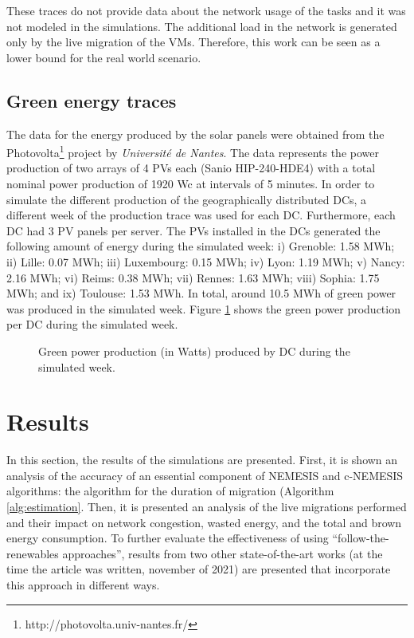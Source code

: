 These traces do not provide data about the network usage of the tasks and it was not modeled in the simulations. The additional load in the network is generated only by the live migration of the VMs. Therefore, this work can be seen as a lower bound for the real world scenario. 

\subsection{Green energy traces}

The data for the energy produced by the solar panels were obtained from the Photovolta\footnote{http://photovolta.univ-nantes.fr/} project by \textit{Université de Nantes}. The data represents the power production of two arrays of 4 PVs each (Sanio HIP-240-HDE4) with a total nominal power production of 1920 Wc at intervals of 5 minutes. In order to simulate the different production of the geographically distributed DCs,  a different week of the production trace was used for each DC. Furthermore, each DC had 3 PV panels per server. The PVs installed in the DCs generated the following amount of energy during the simulated week: i) Grenoble: 1.58 MWh; ii) Lille: 0.07 MWh; iii) Luxembourg: 0.15 MWh; iv) Lyon: 1.19 MWh; v) Nancy: 2.16 MWh; vi) Reims: 0.38 MWh; vii) Rennes: 1.63 MWh; viii) Sophia: 1.75 MWh; and ix) Toulouse: 1.53 MWh. In total, around 10.5 MWh of green power was produced in the simulated week. Figure \ref{fig:green_power} shows the green power production per DC during the simulated week.

 \begin{figure}[!htbp]
  \centering
   {}
  \caption{Green power production (in Watts) produced by DC during the
  simulated week.}
  \label{fig:green_power}
\end{figure}



\section{Results}

\label{sec:results_smargreens}

In this section,  the results of the simulations are presented. First, it is shown an analysis of the accuracy of an essential component of NEMESIS and c-NEMESIS algorithms: the algorithm for the duration of migration (Algorithm \ref{alg:estimation}. Then,  it is presented an analysis of the live migrations performed and their impact on network congestion, wasted energy, and the total and brown energy consumption. To further evaluate the effectiveness of using ``follow-the-renewables approaches'', results from two other state-of-the-art works (at the time the article was written, november of 2021) are presented that incorporate this approach in different ways.



